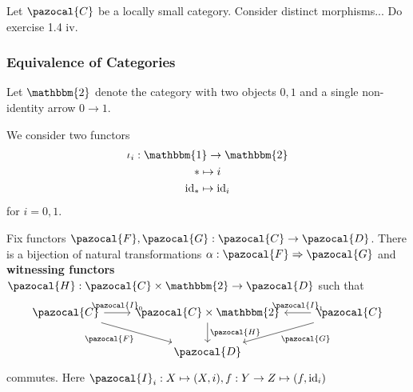 \begin{example}
    Let $\pazocal{C}$ be a locally small category. Consider distinct morphisms... {\Large Do exercise 1.4 iv.}
\end{example}
\subsubsection{Equivalence of Categories}
    \begin{definition}
        Let $\mathbbm{2}$ denote the category with two objects $0,1$ and a single non-identity arrow $0\rightarrow 1$. 
    \end{definition}
    We consider two functors 
    \begin{gather*}
        \iota_i : \mathbbm{1}\rightarrow \mathbbm{2}\\
        \ast \mapsto i\\
        \id_\ast \mapsto \id_i 
    \end{gather*}
    for $i=0,1$. 
    \begin{lemma}
        Fix functors $\pazocal{F},\pazocal{G}:\pazocal{C}\rightarrow \pazocal{D}$. There is a bijection of natural transformations $\alpha: \pazocal{F} \Rightarrow \pazocal{G}$ and \textbf{witnessing functors} $\pazocal{H}:\pazocal{C}\times \mathbbm{2}\rightarrow \pazocal{D}$ such that 
        $$
            \begin{tikzcd}
                \pazocal{C} \arrow[r,"\pazocal{I}_0"]\arrow[rd,"\pazocal{F}",swap] & \pazocal{C}\times \mathbbm{2} \arrow[d,"\pazocal{H}"] & \pazocal{C}\arrow[ld,"\pazocal{G}"]\arrow[l,"\pazocal{I}_1",swap]\\
                & \pazocal{D}
            \end{tikzcd}
        $$
        commutes. Here $\pazocal{I}_i: X\mapsto (X,i), f:Y\rightarrow Z\mapsto (f,\id_i)$
    \end{lemma}
